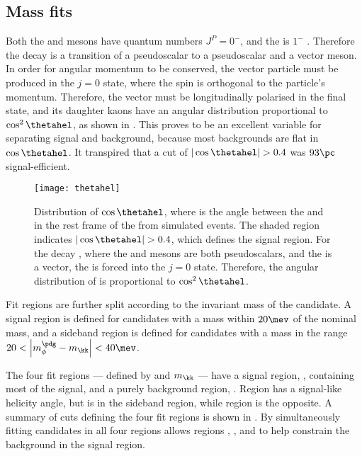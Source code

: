 \subsection{Mass fits}
\label{sec:dsphi:fit}
Both the \Bp and \Ds mesons have quantum numbers $J^P=0^-$, and the \phii is $1^-$ .
Therefore the decay \btodsphi is a transition of a pseudoscalar to a pseudoscalar and a vector
meson.
In order for angular momentum to be conserved, the vector particle must be produced in the $j=0$
state, where the spin is orthogonal to the particle's momentum.
Therefore, the vector \phii must be longitudinally polarised in the final
state, and its daughter kaons have an angular distribution proportional to $\cos^2\thetahel$, as
shown in .
This proves to be an excellent variable for separating signal and background, because most
backgrounds are flat in $\cos\thetahel$.
It transpired that a cut of $|\cos\thetahel|>0.4$ was $93\pc$ signal-efficient.

\begin{figure}
  \begin{center}
    \texttt{[image: thetahel]}
    \caption[Simulated distribution of the helicity angle of the \phii]
    {
      Distribution of $\cos\thetahel$, where \thetahel is the angle between the \Bp and \Kp in the
      rest frame of the \phii from simulated events.
      The shaded region indicates $|\cos\thetahel|>0.4$, which defines the signal region.
      For the decay \btodsphi, where the \Bp and \Ds mesons are both pseudoscalars, and the
      \phii is a vector, the \phii is forced into the $j=0$ state.
      Therefore, the angular distribution of \thetahel is proportional to $\cos^2\thetahel$.
    }
    \label{fig:dsphi:hel}
  \end{center}
\end{figure}

Fit regions are further split according to the invariant mass of the \phii candidate.
A signal region is defined for \phitokk candidates with a mass within $20\mev$ of the nominal \phii
mass, and a sideband region is defined for candidates with a mass in the range
\mbox{$20<\left|m_\phi^\pdg-m_\kk\right|<40\mev$}.

The four fit regions --- defined by \thetahel and $m_{\kk}$ --- have a signal region, \rA,
containing most of the signal, and a purely background region, \rD.
Region \rB has a signal-like helicity angle, but is in the \phii sideband region, while region \rC
is the opposite.
A summary of cuts defining the four fit regions is shown in .
By simultaneously fitting \btodsphi candidates in all four regions allows regions \rB, \rC, and \rD
to help constrain the background in the signal region.

